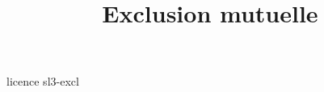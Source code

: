 \documentclass {beamer}
\title {Exclusion mutuelle}
\begin{document}
 {licence}
 {sl3-excl}
\end{document}
